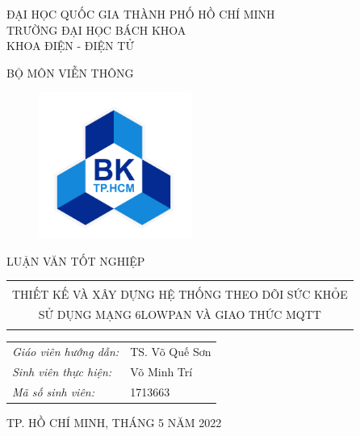 \documentclass{report}
\begin{document}
\begin{titlepage}
\begin{center}
\Large{ĐẠI HỌC QUỐC GIA THÀNH PHỐ HỒ CHÍ MINH \\
TRƯỜNG ĐẠI HỌC BÁCH KHOA \\
KHOA ĐIỆN - ĐIỆN TỬ}
\end{center}
\begin{center}
	\Large{BỘ MÔN VIỄN THÔNG}
\end{center}

\begin{figure}[h]
	\begin{center}
		\includegraphics[width=5cm]{hcmut.png}
	\end{center}
\end{figure}
\begin{center}
	\Huge{LUẬN VĂN TỐT NGHIỆP}
\end{center}

\begin{center}
\begin{tabular}{c}
	\hline
	\\
	\Large{THIẾT KẾ VÀ XÂY DỰNG HỆ THỐNG THEO DÕI SỨC KHỎE}\\
	\Large{SỬ DỤNG MẠNG 6LOWPAN VÀ GIAO THỨC MQTT}\\
	\\
	\hline
\end{tabular}
\end{center}

\vspace{2cm}
\begin{table}[h]
	\centering
	\begin{tabular}{ll}
		{\textit{\Large Giáo viên hướng dẫn:}} & {\Large TS. Võ Quế Sơn} \\
		{\textit{\Large Sinh viên thực hiện:}} & {\Large Võ Minh Trí}    \\
		{\textit{\Large Mã số sinh viên:}}                & {\Large 1713663}       
	\end{tabular}
\end{table}


\vspace{2cm}

\begin{center}	
{\Large TP. HỒ CHÍ MINH, THÁNG 5 NĂM 2022}
\end{center}
\end{titlepage}
\end{document}

